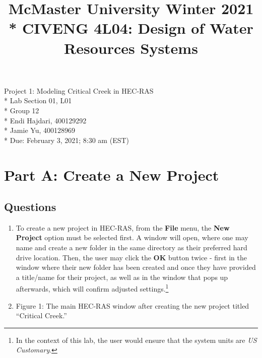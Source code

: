 \documentclass[]{article}
\title{\large{McMaster University Winter 2021} \LARGE \\* CIVENG 4L04: Design of Water Resources Systems}
\date{}
\begin{document}
\maketitle
\thispagestyle{empty}
\begin{center}
	\vspace{3.6cm}
	\Huge Project 1: Modeling Critical Creek in HEC-RAS \\* \vspace{1cm}
	\Large Lab Section 01, L01 \\* \vspace{1cm}
	\Large Group 12 \\* \vspace{0.25cm}
	\large Endi Hajdari, 400129292 \\* \vspace{0.05cm}
	Jamie Yu, 400128969 \\* \vspace{6cm}
	\large Due: February 3, 2021; 8:30 am (EST) 
\end{center}	
\newpage
\doublespacing
\tableofcontents
\singlespacing
\newpage 
\section{Part A: Create a New Project}
\noindent 
\subsection{Questions} \vspace{0.25cm} \begin{enumerate}[label=\textbf{\arabic*.}] 
	\item To create a new project in HEC-RAS, from the \textbf{File} menu, the \textbf{New Project} option must be selected first. A window will open, where one may name and create a new folder in the same directory as their preferred hard drive location. Then, the user may click the \textbf{OK} button twice - first in the window where their new folder has been created and once they have provided a title/name for their project, as well as in the window that pops up afterwards, which will confirm adjusted settings.\footnote{In the context of this lab, the user would ensure that the system units are \textit{US Customary}.} \\
	\item \begin{minipage}[t]{\linewidth}
		\raggedright
		
		\medskip
		\begin{center} 
			Figure 1: The main HEC-RAS window after creating the new project titled \enquote{Critical Creek.}
		\end{center}
	\end{minipage}
\end{enumerate}
\newpage
\end{document}
